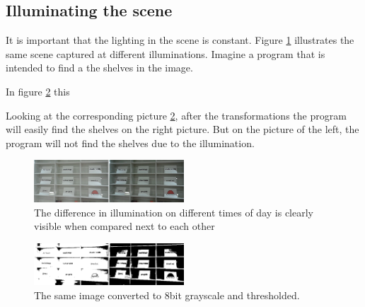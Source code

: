 




\subsection{Illuminating the scene}

It is important that the lighting in the scene is constant. Figure \ref{fig:scene_light} illustrates the same scene captured at different illuminations. Imagine a program that is intended to find a the shelves in the image. 

In figure \ref{fig:scene_thresholded} this 

 Looking at the corresponding picture \ref{fig:scene_thresholded}, after the transformations the program will easily find the shelves on the right picture. But on the picture of the left, the program will not find the shelves due to the illumination.

\begin{figure}[htbp] 
\centering 
\includegraphics[width=0.5\textwidth]{Pictures/HjoerringLibrary/scene_lighting.png} 
\caption{The difference in illumination on different times of day is clearly visible when compared next to each other} 
\label{fig:scene_light} 
\end{figure}

\begin{figure}[htbp] 
\centering 
\includegraphics[width=0.5\textwidth]{Pictures/HjoerringLibrary/scene_lighting_thresholded.png} 
\caption{The same image converted to 8bit grayscale and thresholded.} 
\label{fig:scene_thresholded} 
\end{figure}

